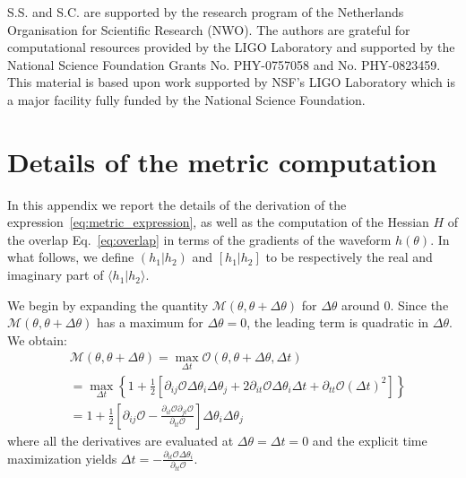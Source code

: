 \documentclass[twocolumn,showpacs,preprintnumbers,nofootinbib,prd,
superscriptaddress,10pt]{revtex4-2}
\newcommand{\scalar}[2]{\langle #1|#2 \rangle}
\newcommand{\rescalar}[2]{( #1|#2 )}
\newcommand{\imscalar}[2]{[ #1|#2 ]}
\begin{document}
        \begin{acknowledgments}
		S.S. and S.C. are supported by the research program of the Netherlands Organisation for Scientific Research (NWO).
		The authors are grateful for computational resources provided by the LIGO Laboratory and supported by the National Science Foundation Grants No. PHY-0757058 and No. PHY-0823459. This material is based upon work supported by NSF’s LIGO Laboratory which is a major facility fully funded by the National Science Foundation.
        \end{acknowledgments}

\newpage
\appendix
\section{Details of the metric computation}\label{app:metric}

In this appendix we report the details of the derivation of the expression~\eqref{eq:metric_expression}, as well as the computation of the Hessian $H$ of the overlap Eq.~\eqref{eq:overlap} in terms of the gradients of the waveform $h(\theta)$. 
In what follows, we define $\rescalar{h_1}{h_2}$ and $\imscalar{h_1}{h_2}$ to be respectively the real and imaginary part of $\scalar{h_1}{h_2}$.

We begin by expanding the quantity $\mathcal{M}(\theta,\theta +\Delta\theta)$ for $\Delta\theta$ around $0$. Since the $\mathcal{M}(\theta,\theta +\Delta\theta)$ has a maximum for $\Delta\theta = 0$, the leading term is quadratic in $\Delta\theta$.
We obtain:
\begin{align} \label{eq:metric_derivation}
	&\mathcal{M}(\theta,\theta +\Delta\theta) = \max_{\Delta t} \mathcal{O}(\theta, \theta + \Delta\theta, \Delta t) \nonumber\\
	& =	\max_{\Delta t} \left\{ 1+ \frac{1}{2}\left[ \partial_{ij}\mathcal{O} \Delta\theta_i \Delta\theta_j + 2  \partial_{it}\mathcal{O} \Delta\theta_i \Delta t + \partial_{tt}\mathcal{O} (\Delta t)^2 \right] \right\}  \nonumber \\
	&= 1 + \frac{1}{2}\left[ \partial_{ij}\mathcal{O} - \frac{\partial_{it}\mathcal{O} \partial_{jt}\mathcal{O}}{\partial_{tt}\mathcal{O}}\right] \Delta\theta_i \Delta\theta_j
\end{align}
where all the derivatives are evaluated at ${\Delta\theta = \Delta t = 0}$ and the explicit time maximization yields
${\Delta t = -\frac{\partial_{it}\mathcal{O} \Delta\theta_i}{\partial_{tt}\mathcal{O}}}$.
\end{document}
